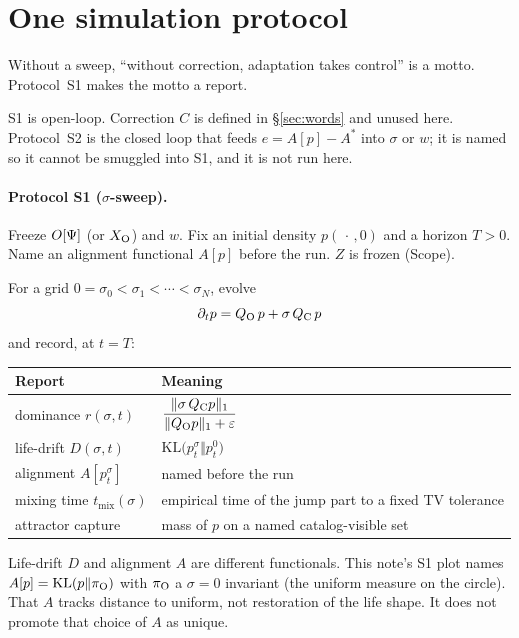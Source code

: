 \section{One simulation protocol}
\label{sec:protocol}

Without a sweep, ``without correction, adaptation takes control'' is a motto.
Protocol~S1 makes the motto a report.

S1 is open-loop.
Correction \(C\) is defined in \S\ref{sec:words} and unused here.
Protocol~S2 is the closed loop that feeds \(e=A[p]-A^{\ast}\) into \(\sigma\) or \(w\);
it is named so it cannot be smuggled into S1, and it is not run here.

\paragraph{Protocol S1 (\(\sigma\)-sweep).}
Freeze \(O[\Psi]\) (or \(X_{\mathrm{O}}\)) and \(w\).
Fix an initial density \(p(\,\cdot\,,0)\) and a horizon \(T>0\).
Name an alignment functional \(A[p]\) before the run.
\(Z\) is frozen (Scope).

For a grid \(0=\sigma_{0}<\sigma_{1}<\cdots<\sigma_{N}\),
evolve
\[
\partial_{t}p = Q_{\mathrm{O}}\,p + \sigma\,Q_{\mathrm{C}}\,p
\]
and record, at \(t=T\):

\begin{center}
\begin{tabular}{@{}ll@{}}
\toprule
Report & Meaning \\
\midrule
dominance \(r(\sigma,t)\) &
  \(\displaystyle\frac{\lVert\sigma\,Q_{\mathrm{C}} p\rVert_{1}}{\lVert Q_{\mathrm{O}} p\rVert_{1}+\varepsilon}\) \\
life-drift \(D(\sigma,t)\) &
  \(\mathrm{KL}\bigl(p_{t}^{\sigma}\big\Vert p_{t}^{0}\bigr)\) \\
alignment \(A[p_{t}^{\sigma}]\) &
  named before the run \\
mixing time \(t_{\mathrm{mix}}(\sigma)\) &
  empirical time of the jump part to a fixed TV tolerance \\
attractor capture &
  mass of \(p\) on a named catalog-visible set \\
\bottomrule
\end{tabular}
\end{center}

Life-drift \(D\) and alignment \(A\) are different functionals.
This note's S1 plot names
\(A[p]=\mathrm{KL}(p\Vert\pi_{\mathrm{O}})\) with \(\pi_{\mathrm{O}}\) a \(\sigma=0\) invariant
(the uniform measure on the circle).
That \(A\) tracks distance to uniform, not restoration of the life shape.
It does not promote that choice of \(A\) as unique.

